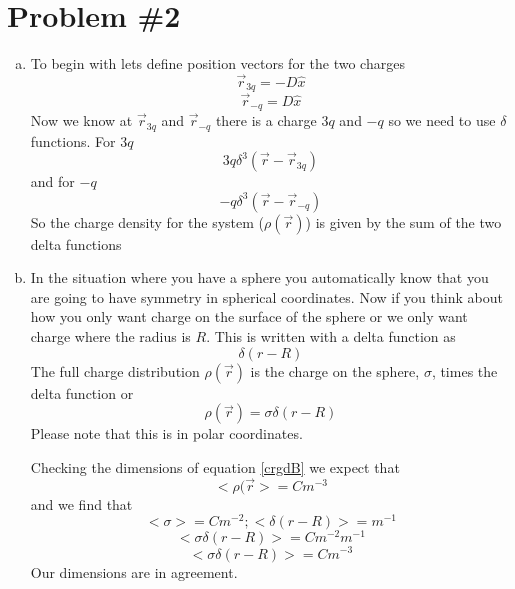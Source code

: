 \documentclass[11pt]{article}
\numberwithin{equation}{section}
\begin{document}
\section{Problem \#2}
\begin{enumerate}[(a)]
\item To begin with lets define position vectors for the two charges
$$\vec{r}_{3q} = -D\hat{x}$$
$$\vec{r}_{-q} = D\hat{x}$$
Now we know at $\vec{r}_{3q}$ and $\vec{r}_{-q}$ there is a charge $3q$ and $-q$ so we need to use $\delta$ functions. For $3q$
$$3q\delta^3(\vec{r}-\vec{r}_{3q})$$
and for $-q$
$$-q\delta^3(\vec{r}-\vec{r}_{-q})$$
So the charge density for the system ($\rho(\vec{r})$) is given by the sum of the two delta functions
\begin{center}
\end{center}

\item
In the situation where you have a sphere you automatically know that you are going to have symmetry in spherical coordinates. Now if you think about how you only want charge on the surface of the sphere or we only want charge where the radius is $R$. This is written with a delta function as
$$\delta(r-R)$$
The full charge distribution $\rho(\vec{r})$ is the charge on the sphere, $\sigma$, times the delta function or
\begin{equation}
\rho(\vec{r}) = \sigma\delta(r-R)
\label{crgdB}
\end{equation}
Please note that this is in polar coordinates.

Checking the dimensions of equation \ref{crgdB} we expect that 
$$<\rho(\vec{r}> = C m^{-3}$$
and we find that
$$<\sigma> = C m^{-2}; <\delta(r-R)> = m^{-1}$$
$$<\sigma\delta(r-R)> = C m^{-2}m^{-1}$$
$$<\sigma\delta(r-R)> = C m^{-3}$$
Our dimensions are in agreement.


\end{enumerate}
\end{document}
